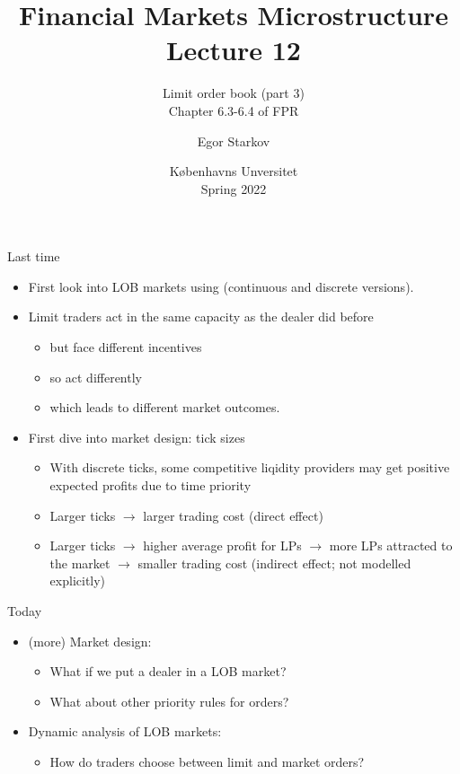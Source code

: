 \documentclass[english,10pt
,aspectratio=169
]{beamer}
\title{Financial Markets Microstructure \\ Lecture 12}
\subtitle{Limit order book (part 3)\\
	Chapter 6.3-6.4 of FPR}
\author{Egor Starkov}
\date{K{\o}benhavns Unversitet \\
	Spring 2022}
\begin{document}
\frame[plain]{\titlepage}


\begin{frame}{Last time}
	\begin{itemize}
		\item First look into LOB markets using \cite{glosten_is_1994} (continuous and discrete versions).
		\item Limit traders act in the same capacity as the dealer did before
		\begin{itemize}
			\item but face different incentives
			\item so act differently
			\item which leads to different market outcomes.
		\end{itemize}
		\item First dive into market design: tick sizes
		\begin{itemize}
			\item With discrete ticks, some competitive liqidity providers may get positive expected profits due to time priority
			\item Larger ticks $\to$ larger trading cost (direct effect)
			\item Larger ticks $\to$ higher average profit for LPs $\to$ more LPs attracted to the market $\to$ smaller trading cost (indirect effect; not modelled explicitly)
		\end{itemize}
	\end{itemize}
\end{frame}


\begin{frame}{Today}
	\begin{itemize}
		\item (more) Market design:
		\begin{itemize}
			\item What if we put a dealer in a LOB market?
			\item What about other priority rules for orders?
		\end{itemize}
		\item Dynamic analysis of LOB markets:
		\begin{itemize}
			\item How do traders choose between limit and market orders?
		\end{itemize}
	\end{itemize}
\end{frame}
\end{document}
